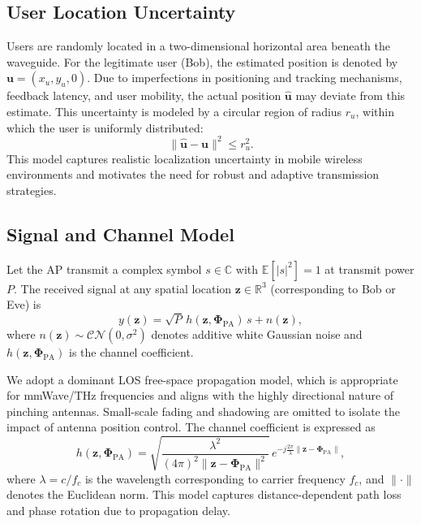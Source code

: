 \documentclass[journal,10pt]{IEEEtran}
\begin{document}
\subsection{User Location Uncertainty}

Users are randomly located in a two-dimensional horizontal area beneath the waveguide. For the legitimate user (Bob), the estimated position is denoted by $\mathbf{u} = (x_u, y_u, 0)$. Due to imperfections in positioning and tracking mechanisms, feedback latency, and user mobility, the actual position $\hat{\mathbf{u}}$ may deviate from this estimate. This uncertainty is modeled by a circular region of radius $r_u$, within which the user is uniformly distributed:
\begin{equation}
\|\hat{\mathbf{u}} - \mathbf{u}\|^2 \leq r_u^2.
\end{equation}
This model captures realistic localization uncertainty in mobile wireless environments and motivates the need for robust and adaptive transmission strategies.


\subsection{Signal and Channel Model}

Let the AP transmit a complex symbol $s \in \mathbb{C}$ with $\mathbb{E}[|s|^2]=1$ at transmit power $P$. The received signal at any spatial location $\mathbf{z} \in \mathbb{R}^3$ (corresponding to Bob or Eve) is
\begin{equation}
y(\mathbf{z}) = \sqrt{P}\, h(\mathbf{z}, \boldsymbol{\Phi}_{\mathrm{PA}})\, s + n(\mathbf{z}),
\label{eq:received_signal}
\end{equation}
where $n(\mathbf{z}) \sim \mathcal{CN}(0,\sigma^2)$ denotes additive white Gaussian noise and $h(\mathbf{z}, \boldsymbol{\Phi}_{\mathrm{PA}})$ is the channel coefficient.

We adopt a dominant LOS free-space propagation model, which is appropriate for mmWave/THz frequencies and aligns with the highly directional nature of pinching antennas. Small-scale fading and shadowing are omitted to isolate the impact of antenna position control. The channel coefficient is expressed as
\begin{equation}
h(\mathbf{z}, \boldsymbol{\Phi}_{\mathrm{PA}}) =
\sqrt{\frac{\lambda^2}{(4\pi)^2 \|\mathbf{z} - \boldsymbol{\Phi}_{\mathrm{PA}}\|^2}}
\, e^{-j \frac{2\pi}{\lambda} \|\mathbf{z} - \boldsymbol{\Phi}_{\mathrm{PA}}\|},
\label{eq:channel_coefficient}
\end{equation}
where $\lambda = c/f_c$ is the wavelength corresponding to carrier frequency $f_c$, and $\|\cdot\|$ denotes the Euclidean norm. This model captures distance-dependent path loss and phase rotation due to propagation delay.
\end{document}
